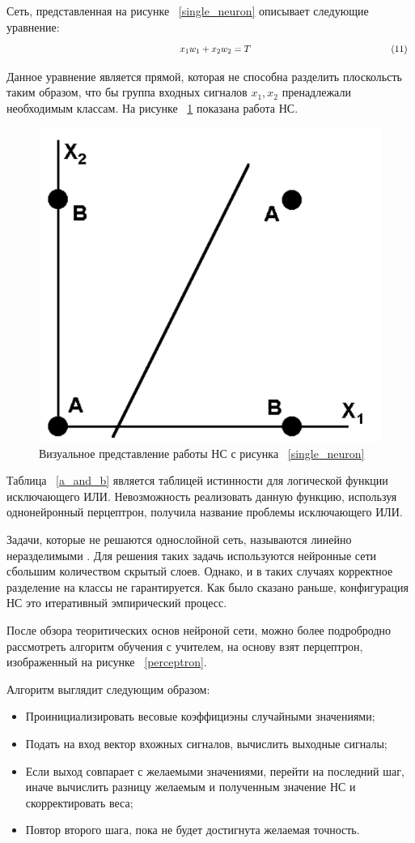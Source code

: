 \documentclass[a4paper,english,russian]{G2-105}
\begin{document}
\par Сеть, представленная на рисунке ~\ref{single_neuron} описывает следующие уравнение:
\[
\ \hspace*{62mm} x_1 w_1 + x_2 w_2=T \ \hspace*{52mm} (11)
\] 
\par Данное уравнение является прямой, которая не способна разделить плоскольсть таким образом, что бы группа входных сигналов $x_1, x_2$ пренадлежали необходимым классам. На рисунке ~\ref{line_class} показана работа НС.
\begin{figure}
\begin{center}
    \includegraphics[width=0.6\linewidth]{line_class.png}
    \caption{Визуальное представление работы НС с рисунка ~\ref{single_neuron}}
	\label{line_class}
\end{center}
\end{figure}
\par Таблица ~\ref{a_and_b} является таблицей истинности для логической функции исключающего ИЛИ. Невозможность реализовать данную функцию, используя однонейронный перцептрон, получила название проблемы исключающего ИЛИ.
\par Задачи, которые не решаются однослойной сеть, называются линейно неразделимыми \cite{13}. Для решения таких задачь используются нейронные сети сбольшим количеством скрытый слоев. Однако, и в таких случаях корректное разделение на классы не гарантируется. Как было сказано раньше, конфигурация НС это итеративный эмпирический процесс.
\par После обзора теоритических основ нейроной сети, можно более подробродно рассмотреть алгоритм обучения с учителем, на основу взят перцептрон, изображенный на рисунке ~\ref{perceptron}.
\par Алгоритм выглядит следующим образом:
\begin{itemize}
\item Проинициализировать весовые коэффициэны случайными значениями;
\item Подать на вход вектор вхожных сигналов, вычислить выходные сигналы;
\item Если выход совпарает с желаемыми значениями, перейти на последний шаг, иначе вычислить разницу желаемым и полученным значение НС и скорректировать веса;
\item Повтор второго шага, пока не будет достигнута желаемая точность.
\end{itemize}
\end{document}
